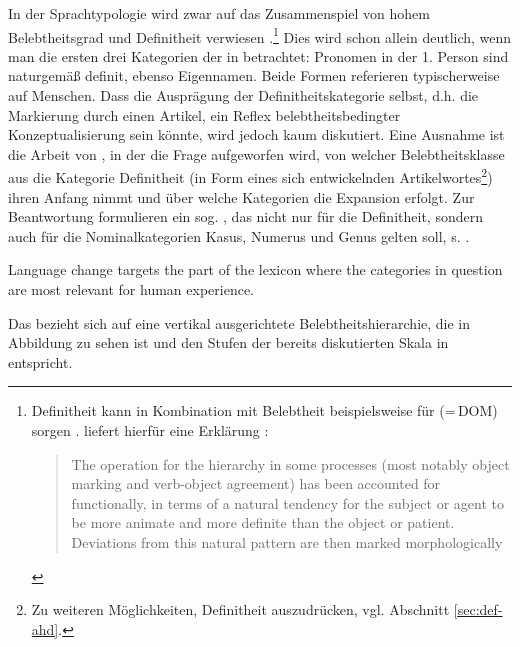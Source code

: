 In der Sprachtypologie wird zwar auf das Zusammenspiel von hohem Belebtheitsgrad und Definitheit verwiesen \parencites()()[s. z.B.][53]{Dahl1996}[][166--167]{Croft2006}.\footnote{Definitheit kann in Kombination mit Belebtheit beispielsweise für  (=\,DOM) sorgen \parencite{Aissen2003}. \textcite{Lyons1999} liefert hierfür eine Erklärung \parencite[ähnlich argumentiert auch][119]{Croft1995}: \blockcquote[2014]{Lyons1999}{The operation for the hierarchy in some processes (most notably object marking and verb-object agreement) has been accounted for functionally, in terms of a natural tendency for the subject or agent to be more animate and more definite than the object or patient. Deviations from this natural pattern are then marked morphologically}.}
Dies wird schon allein deutlich,  wenn man die ersten drei Kategorien der  in  betrachtet: Pronomen in der 1. Person sind naturgemäß definit, ebenso Eigennamen. Beide Formen referieren typischerweise auf Menschen. Dass die Ausprägung der Definitheitskategorie selbst, d.h. die  Markierung durch einen Artikel, ein Reflex belebtheitsbedingter Konzeptualisierung sein könnte, wird jedoch kaum diskutiert. Eine Ausnahme ist die Arbeit von \textcite{Enger2011}, in der die Frage aufgeworfen wird, von welcher Belebtheitsklasse aus die Kategorie Definitheit (in Form eines sich entwickelnden Artikelwortes\footnote{Zu weiteren Möglichkeiten, Definitheit auszudrücken, vgl. Abschnitt \ref{sec:def-ahd}.}) ihren Anfang nimmt und über welche Kategorien die Expansion erfolgt. Zur Beantwortung formulieren \textcite[206]{Enger2011} ein sog. , das nicht nur für die Definitheit, sondern auch für die Nominalkategorien Kasus, Numerus und Genus gelten soll, s. . 
\begin{exe}
	\ex \label{ex:enger} Language change targets the part of the lexicon where the categories in question are most relevant for human experience.
	\end{exe}
\noindent
Das  bezieht sich auf eine vertikal ausgerichtete Belebtheitshierarchie, die in Abbildung  zu sehen ist und den Stufen der bereits diskutierten Skala in   entspricht. 

